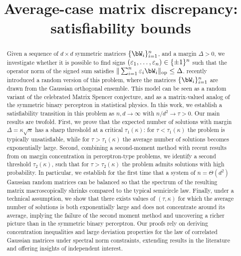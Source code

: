 \documentclass[letterpaper,11pt]{article}
\begin{document}
\title{Average-case matrix discrepancy: satisfiability bounds}
\date{}
\author{}

\maketitle

\begin{abstract}
    Given a sequence of $d \times d$ symmetric matrices $\{\bW_i\}_{i=1}^n$, and a margin $\Delta > 0$, we investigate whether it is possible to find signs $(\varepsilon_1, \dots, \varepsilon_n) \in \{\pm 1\}^n$ such that the operator norm of the signed sum satisfies $\|\sum_{i=1}^n \eps_i \bW_i\|_\op \leq \Delta$.
    \cite{kunisky2023online} recently introduced a random version of this problem, where the matrices $\{\bW_i\}_{i=1}^n$ are drawn from the Gaussian orthogonal ensemble. 
    This model can be seen as a random variant of the celebrated Matrix Spencer conjecture, and as a matrix-valued analog of the symmetric binary perceptron in statistical physics.
%
    In this work, we establish a satisfiability transition in this problem as $n, d \to \infty$ with $n / d^2 \to \tau > 0$.
    Our main results are twofold.
    First, we prove that the expected number of solutions with margin $\Delta = \kappa \sqrt{n}$ has a sharp threshold at a critical $\tau_1(\kappa)$: 
    for $\tau < \tau_1(\kappa)$ the problem is typically unsatisfiable, while for $\tau > \tau_1(\kappa)$ the average number of solutions becomes exponentially large.
    Second, combining a second-moment method with recent results from \cite{altschuler2023zero} on margin concentration in perceptron-type problems, we identify a second threshold $\tau_2(\kappa)$, 
    such that for $\tau > \tau_2(\kappa)$ the problem admits solutions with high probability.
%
    In particular, we establish for the first time that a system of $n = \Theta(d^2)$ Gaussian random matrices can be balanced so that the spectrum of the resulting matrix macroscopically shrinks compared to the typical semicircle law.
    Finally, under a technical assumption, we show that there exists values of $(\tau,\kappa)$ for which the average number of solutions is both exponentially large and does not concentrate around its average, 
    implying the failure of the second moment method and uncovering a richer picture than in the symmetric binary perceptron.
    Our proofs rely on deriving concentration inequalities and large deviation properties for the law of correlated Gaussian matrices under spectral norm constraints, extending results in the literature and offering insights of independent interest.
\end{abstract}
\end{document}
